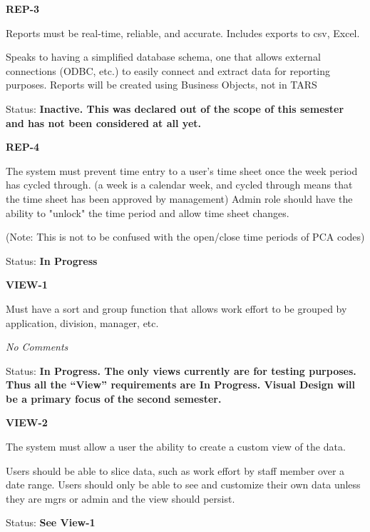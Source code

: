 \documentclass{article}
\begin{document}
  
\noindent \textbf{REP-3}

\noindent Reports must be real-time, reliable, and accurate. Includes exports to csv, Excel.

\noindent Speaks to having a simplified database schema, one that allows external connections (ODBC, etc.) to easily connect and extract data for reporting purposes. Reports will be created using Business Objects, not in TARS

\noindent Status: \textbf{Inactive.   This was declared out of the scope of this semester and has not been considered at all yet.}

\noindent \textit{}


\noindent \textbf{REP-4}

\noindent The system must prevent time entry to a user's time sheet once the week period has cycled through. (a week is a calendar week, and cycled through means that the time sheet has been approved by management)  Admin role should have the ability to "unlock" the time period and allow time sheet changes.
	
\noindent(Note: This is not to be confused with the open/close time periods of PCA codes)

\noindent Status: \textbf{In Progress}\

\noindent \textit{}


\noindent \textbf{VIEW-1}

\noindent Must have a sort and group function that allows work effort to be grouped by application, division, manager, etc.

 \textit{No Comments}

\noindent Status: \textbf{In Progress.  The only views currently are for testing purposes.  Thus all the ``View'' requirements are In Progress.  Visual Design will be a primary focus of the second semester.}\textit{ }

\noindent \textit{}


\noindent \textbf{VIEW-2}

\noindent The system must allow a user the ability to create a custom view of the data.

\noindent Users should be able to slice data, such as work effort by staff member over a date range. Users should only be able to see and customize their own data unless they are mgrs or admin and the view should persist.

Status: \textbf{See View-1}

\noindent \textit{}
\end{document}
